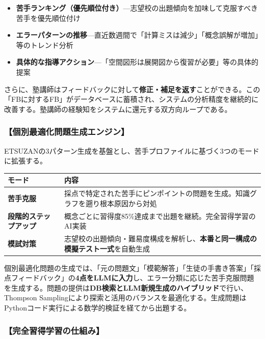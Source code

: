 \documentclass[paper=a4,fontsize=10.5bp,jafontsize=10.5bp,twocolumn]{jlreq}
\begin{document}
\begin{itemize}
  \item \textbf{苦手ランキング（優先順位付き）}---志望校の出題傾向を加味して克服すべき苦手を優先順位付け
  \item \textbf{エラーパターンの推移}---直近数週間で「計算ミスは減少」「概念誤解が増加」等のトレンド分析
  \item \textbf{具体的な指導アクション}---「空間図形は展開図から復習が必要」等の具体的提案
\end{itemize}

さらに、塾講師はフィードバックに対して\textbf{修正・補足を返す}ことができる。この「FBに対するFB」がデータベースに蓄積され、システムの分析精度を継続的に改善する。塾講師の経験知をシステムに還元する双方向ループである。

\subsubsection{【個別最適化問題生成エンジン】}

ETSUZANの3パターン生成を基盤とし、苦手プロファイルに基づく3つのモードに拡張する。


\begin{footnotesize}\noindent
\begin{tabularx}{\linewidth}{>{\bfseries}l X}
\toprule
モード & 内容 \\
\midrule
苦手克服 & 採点で特定された苦手にピンポイントの問題を生成。知識グラフを遡り根本原因から対処 \\
段階的ステップアップ & 概念ごとに習得度85\%達成まで出題を継続。完全習得学習のAI実装 \\
模試対策 & 志望校の出題傾向・難易度構成を解析し、\textbf{本番と同一構成の模擬テスト一式}を自動生成 \\
\bottomrule
\end{tabularx}
\end{footnotesize}


個別最適化問題の生成では、「元の問題文」「模範解答」「生徒の手書き答案」「採点フィードバック」の\textbf{4点をLLMに入力}し、エラー分類に応じた苦手克服問題を生成する。問題の提供は\textbf{DB検索とLLM新規生成のハイブリッド}で行い、Thompson Samplingにより探索と活用のバランスを最適化する。生成問題はPythonコード実行による数学的検証を経てから出題する。

\subsubsection{【完全習得学習の仕組み】}
\end{document}
